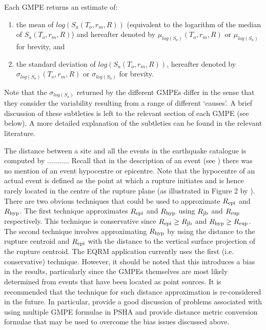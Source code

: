 Each GMPE returns an estimate of:
\begin{enumerate}
\item the mean of $log(S_a(T_o,r_m,R))$ (equivalent to the
logarithm of the median of $S_a(T_o,r_m,R)$) and hereafter denoted
by $\mu_{log(S_a)}(T_o,r_m,R)$ or $\mu_{log(S_a)}$ for brevity,
and \item the standard deviation of $log(S_a(T_o,r_m,R))$,
hereafter denoted by \newline $\sigma_{log(S_a)}(T_o,r_m,R)$ or
$\sigma_{log(S_a)}$ for brevity.
\end{enumerate}
Note that the $\sigma_{log(S_a)}$ returned by the different GMPEs
differ in the sense that they consider the variability resulting
from a range of different `causes'. A brief discussion of these
subtleties is left to the relevant section of each GMPE (see below).
A more detailed explanation of the subtleties can be found in the
relevant literature.

The distance between a site and all the events in the earthquake
catalogue is computed by ........... Recall that in the description
of an event (see ) there was no mention of
an event hypocentre or epicentre. Note that the hypocentre of an
actual event is defined as the point at which a rupture initiates
\citep{dr_Kramer96a} and is hence rarely located in the centre of
the rupture plane (as illustrated in Figure 2 by
\citet{dr_Sibson03a}). There are two obvious techniques that could
be used to approximate $\Repi$ and $\Rhyp$. The first technique
approximates $\Repi$ and $\Rhyp$ using $\Rjb$ and $\Rrup$
respectively. This technique is conservative since \mbox{$\Repi \geq
\Rjb$} and \mbox{$\Rhyp \geq \Rrup$}. The second technique involves
approximating $\Rhyp$ by using the distance to the rupture centroid
and $\Repi$ with the distance to the vertical surface projection of
the rupture centroid. The EQRM application currently uses the first
(i.e. conservative) technique. However, it should be noted that this
introduces a bias in the results, particularly since the GMPEs
themselves are most likely determined from events that have been
located as point sources. It is recommended that the technique for
such distance approximation is re-considered in the future. In
particular, \citet{dr_Bommer05a} provide a good discussion of
problems associated with using multiple GMPE formulae in PSHA and
\citet{dr_Scherbaum04a} provide distance metric conversion formulae
that may be used to overcome the bias issues discussed above.


